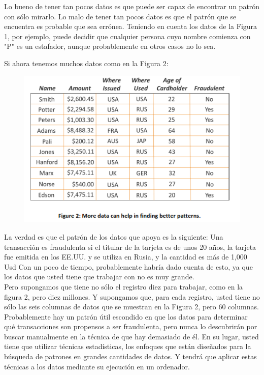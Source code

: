\documentclass[11pt]{article}
\begin{document}
\newpage

Lo bueno de tener tan pocos datos es que puede ser capaz de encontrar un patrón con sólo mirarlo. Lo malo de tener tan pocos datos es que el patrón que se encuentra es probable que sea errónea. Teniendo en cuenta los datos de la Figura 1, por ejemplo, puede decidir que cualquier persona cuyo nombre comienza con "P" es un estafador, aunque probablemente en otros casos no lo sea.

Si ahora tenemos muchos datos como en la Figura 2:

\begin{figure}[htp]
\centering
\includegraphics[width=13cm]{b.jpg}
\label{fig:lion}
\end{figure}


La verdad es que el patrón de los datos que apoya es la siguiente: Una transacción es fraudulenta si el titular de la tarjeta es de unos 20 años, la tarjeta fue emitida en los EE.UU. y se utiliza en Rusia, y la cantidad es más de  1,000 Usd Con un poco de tiempo, probablemente habría dado cuenta de esto, ya que los datos que usted tiene que trabajar con no es muy grande.\\

Pero supongamos que tiene no sólo el registro diez para trabajar, como en la figura 2, pero diez millones. Y supongamos que, para cada registro, usted tiene no sólo las seis columnas de datos que se muestran en la Figura 2, pero 60 columnas. Probablemente hay un patrón útil escondido en que los datos para determinar qué transacciones son propensos a ser fraudulenta, pero nunca lo descubrirán por buscar manualmente en la técnica de que hay demasiado de él. En su lugar, usted tiene que utilizar técnicas estadísticas, los enfoques que están diseñados para la búsqueda de patrones en grandes cantidades de datos. Y tendrá que aplicar estas técnicas a los datos mediante su ejecución en un ordenador.\\
\end{document}
